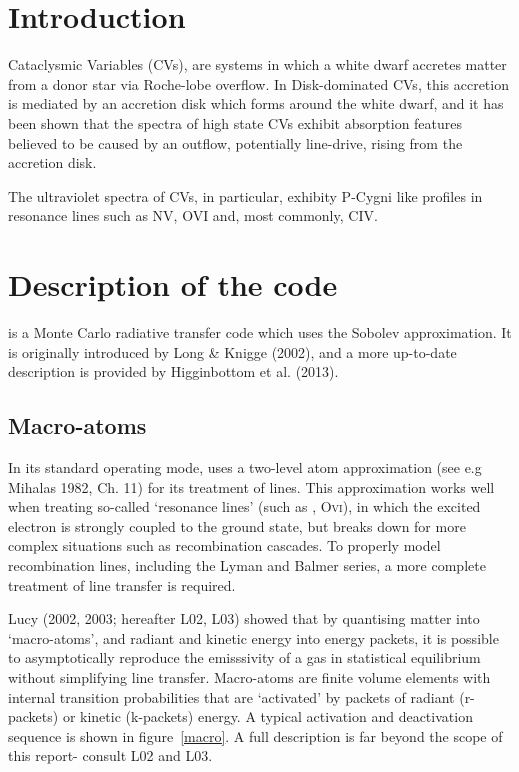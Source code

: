 \documentclass[usenatbib, a4paper]{mn2e}
\begin{document}
%
%

\section{Introduction} 

Cataclysmic Variables (CVs), are systems in which a white dwarf accretes matter from a donor star
via Roche-lobe overflow. In Disk-dominated CVs, this accretion is mediated by an accretion disk which forms 
around the white dwarf, and it has been shown that the spectra of high state CVs
exhibit absorption features believed to be caused by an outflow, potentially line-drive,
rising from the accretion disk. 

The ultraviolet spectra of CVs, in particular, exhibity P-Cygni like profiles in resonance lines such as 
NV, OVI and, most commonly, CIV.




%
%

\section{Description of the code}

\py is a Monte Carlo radiative transfer code which uses the Sobolev approximation. It is originally
introduced by Long \& Knigge (2002), and a more up-to-date description is provided by
Higginbottom et al. (2013). 


\subsection{Macro-atoms}
In its standard operating mode, \py uses a two-level atom approximation (see e.g Mihalas 1982\nocite{mihalas}, Ch. 11) for its treatment of lines. This approximation works well when treating so-called `resonance lines' (such as \civ, O\textsc{vi}), in which the excited electron is strongly coupled to the ground state, but breaks down for more complex situations such as recombination cascades. To properly model recombination lines, including the Lyman and Balmer series, a more complete treatment of line transfer is required.

Lucy (2002, 2003\nocite{lucy2002, lucy2003}; hereafter L02, L03) showed that by quantising matter into `macro-atoms', and radiant and kinetic energy into energy packets, it is possible to asymptotically reproduce the emisssivity of a gas in statistical equilibrium without simplifying line transfer. Macro-atoms are finite volume elements with internal transition probabilities that are `activated' by packets of radiant (r-packets) or kinetic (k-packets) energy. A typical activation and deactivation sequence is shown in figure~\ref{macro}.
A full description is far beyond the scope of this report- consult L02 and L03. 
\end{document}
